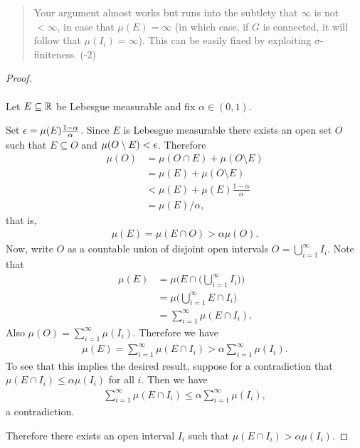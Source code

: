 \begin{quote}
  Your argument almost works but runs into the subtlety that $\infty$ is not $< \infty$, in case
  that $\mu(E) = \infty$ (in which case, if $G$ is connected, it will follow that $\mu(I_i) = \infty$). This
  can be easily fixed by exploiting $\sigma$-finiteness. (-2)
\end{quote}

\begin{proof}~\\~\\
  Let $E \subseteq \mathbb{R}$ be Lebesgue measurable and fix $\alpha \in (0, 1)$.

  Set $\epsilon = \mu(E)\frac{1 - \alpha}{\alpha}$. Since $E$ is Lebesgue measurable there exists an open set $O$
  such that $E \subseteq O$ and $\mu(O \setminus E) < \epsilon$. Therefore
  \begin{align*}
    \mu(O)
    &= \mu(O \cap E) + \mu(O \setminus E) \\
    &= \mu(E) + \mu(O \setminus E) \\
    &< \mu(E) + \mu(E)\frac{1 - \alpha}{\alpha} \\
    &= \mu(E)/\alpha,
  \end{align*}
  that is,
  \begin{align*}
    \mu(E) = \mu(E \cap O) > \alpha\mu(O).
  \end{align*}
  Now, write $O$ as a countable union of disjoint open intervals $O = \bigcup_{i=1}^\infty I_i$. Note that
    \begin{align*}
    \mu(E)
    &= \mu\Big(E \cap \big(\bigcup_{i=1}^\infty I_i\big)\Big) \\
    &= \mu\Big(\bigcup_{i=1}^\infty E \cap I_i\Big) \\
    &= \sum_{i=1}^\infty \mu(E \cap I_i).
  \end{align*}
  Also $\mu(O) = \sum_{i=1}^\infty \mu(I_i)$. Therefore we have
  \begin{align*}
    \mu(E) = \sum_{i=1}^\infty \mu(E \cap I_i) > \alpha \sum_{i=1}^\infty \mu(I_i).
  \end{align*}
  To see that this implies the desired result, suppose for a contradiction
  that $\mu(E \cap I_i) \leq \alpha \mu(I_i)$ for all $i$. Then we have
  \begin{align*}
    \sum_{i=1}^\infty \mu(E \cap I_i) \leq \alpha \sum_{i=1}^\infty \mu(I_i),
  \end{align*}
  a contradiction.

  Therefore there exists an open interval $I_i$ such that $\mu(E \cap I_i) > \alpha \mu(I_i)$.
\end{proof}


